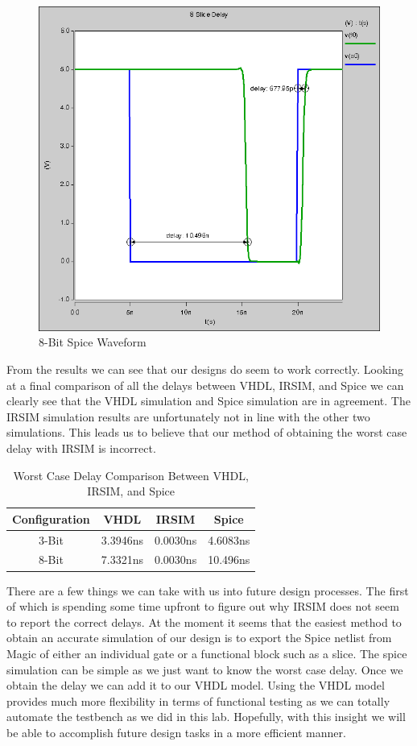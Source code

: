 \documentclass{article}
\begin{document}
\begin{figure}[H]
    \centering
    \includegraphics[width=0.6\linewidth]{../part_6/fun8.png}
    \caption{8-Bit Spice Waveform}
\end{figure}

\newpage
From the results we can see that our designs do seem to work correctly. Looking
at a final comparison of all the delays between VHDL, IRSIM, and Spice we can
clearly see that the VHDL simulation and Spice simulation are in agreement. The
IRSIM simulation results are unfortunately not in line with the other two
simulations.  This leads us to believe that our method of obtaining the worst
case delay with IRSIM is incorrect.

\vspace{0.25in}
\begin{table}[H]
    \centering
    \begin{tabular}{cccc}
        \toprule
        \textbf{Configuration} & \textbf{VHDL} & \textbf{IRSIM} & \textbf{Spice}\\
        \midrule
        3-Bit & 3.3946ns & 0.0030ns & 4.6083ns\\
        8-Bit & 7.3321ns & 0.0030ns & 10.496ns\\
        \bottomrule
    \end{tabular}
    \caption{Worst Case Delay Comparison Between VHDL, IRSIM, and Spice}
\end{table}

\vspace{0.25in}
There are a few things we can take with us into future design processes. The
first of which is spending some time upfront to figure out why IRSIM does not
seem to report the correct delays. At the moment it seems that the easiest method
to obtain an accurate simulation of our design is to export the Spice netlist
from Magic of either an individual gate or a functional block such as a slice.
The spice simulation can be simple as we just want to know the worst case
delay.  Once we obtain the delay we can add it to our VHDL model. Using the
VHDL model provides much more flexibility in terms of functional testing as we
can totally automate the testbench as we did in this lab. Hopefully, with this
insight we will be able to accomplish future design tasks in a more efficient manner.
\end{document}
